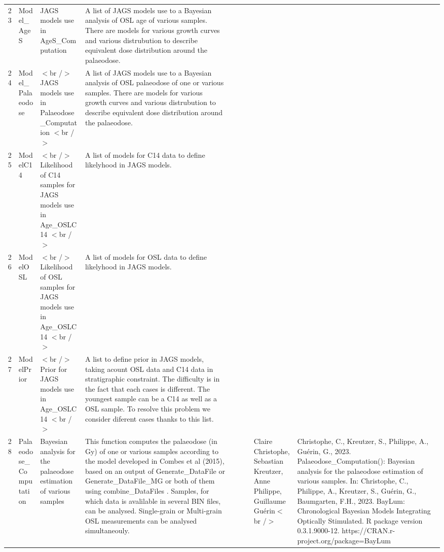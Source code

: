 \begin{table}[ht]
\begin{tabular}{rllllllll}
  23 & Model\_AgeS & JAGS models use in  AgeS\_Computation & A list of JAGS models use to a Bayesian analysis of OSL age of various samples. There are models for various growth curves and various distrubution to describe equivalent dose distribution around the palaeodose. &  &  &  &  &  \\ 
  24 & Model\_Palaeodose & $<$br /$>$ JAGS models use in  Palaeodose\_Computation $<$br /$>$ & A list of JAGS models use to a Bayesian analysis of OSL palaeodose of one or various samples. There are models for various growth curves and various distrubution to describe equivalent dose distribution around the palaeodose. &  &  &  &  &  \\ 
  25 & ModelC14 & $<$br /$>$ Likelihood of C14 samples for JAGS models use in  Age\_OSLC14 $<$br /$>$ & A list of models for C14 data to define likelyhood in JAGS models. &  &  &  &  &  \\ 
  26 & ModelOSL & $<$br /$>$ Likelihood of OSL samples for JAGS models use in  Age\_OSLC14 $<$br /$>$ & A list of models for OSL data to define likelyhood in JAGS models. &  &  &  &  &  \\ 
  27 & ModelPrior & $<$br /$>$ Prior for JAGS models use in  Age\_OSLC14 $<$br /$>$ & A list to define prior in JAGS models, taking acount OSL data and C14 data in stratigraphic constraint. The difficulty is in the fact that each cases is different. The youngest sample can be a C14 as well as a OSL sample. To resolve this problem we consider diferent cases thanks to this list. &  &  &  &  &  \\ 
  28 & Palaeodose\_Computation & Bayesian analysis for the palaeodose estimation of various samples & This function computes the palaeodose (in Gy) of one or various samples according to the model developed in Combes et al (2015), based on an output of  Generate\_DataFile  or  Generate\_DataFile\_MG  or both of them using  combine\_DataFiles .  Samples, for which data is avalilable in several BIN files, can be analysed.  Single-grain or Multi-grain OSL measurements can be analysed simultaneouly. &  &  &  & Claire Christophe, Sebastian Kreutzer, Anne Philippe, Guillaume Guérin$<$br /$>$ & Christophe, C., Kreutzer, S., Philippe, A., Guérin, G., 2023. Palaeodose\_Computation(): Bayesian analysis for the palaeodose estimation of various samples. In: Christophe, C., Philippe, A., Kreutzer, S., Guérin, G., Baumgarten, F.H., 2023. BayLum: Chronological Bayesian Models Integrating Optically Stimulated. R package version 0.3.1.9000-12. https://CRAN.r-project.org/package=BayLum
 \\ 

\end{tabular}
\end{table}
